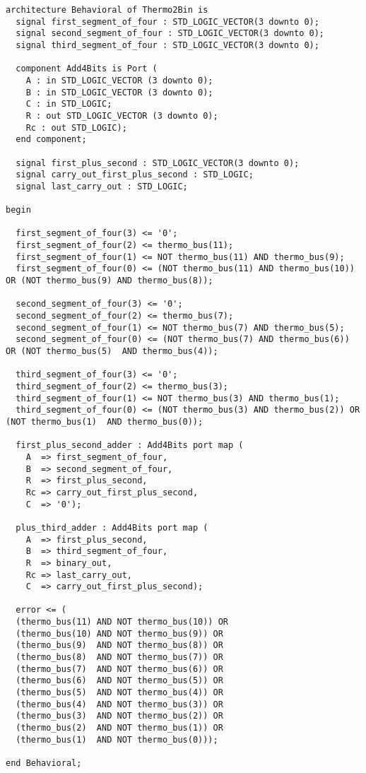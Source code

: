 \begin{verbatim}
architecture Behavioral of Thermo2Bin is
  signal first_segment_of_four : STD_LOGIC_VECTOR(3 downto 0);
  signal second_segment_of_four : STD_LOGIC_VECTOR(3 downto 0);
  signal third_segment_of_four : STD_LOGIC_VECTOR(3 downto 0);

  component Add4Bits is Port (
    A : in STD_LOGIC_VECTOR (3 downto 0);
    B : in STD_LOGIC_VECTOR (3 downto 0);
    C : in STD_LOGIC;
    R : out STD_LOGIC_VECTOR (3 downto 0);
    Rc : out STD_LOGIC);
  end component;

  signal first_plus_second : STD_LOGIC_VECTOR(3 downto 0);
  signal carry_out_first_plus_second : STD_LOGIC;
  signal last_carry_out : STD_LOGIC;

begin

  first_segment_of_four(3) <= '0';
  first_segment_of_four(2) <= thermo_bus(11);
  first_segment_of_four(1) <= NOT thermo_bus(11) AND thermo_bus(9);
  first_segment_of_four(0) <= (NOT thermo_bus(11) AND thermo_bus(10)) OR (NOT thermo_bus(9) AND thermo_bus(8));

  second_segment_of_four(3) <= '0';
  second_segment_of_four(2) <= thermo_bus(7);
  second_segment_of_four(1) <= NOT thermo_bus(7) AND thermo_bus(5);
  second_segment_of_four(0) <= (NOT thermo_bus(7) AND thermo_bus(6)) OR (NOT thermo_bus(5)  AND thermo_bus(4));

  third_segment_of_four(3) <= '0';
  third_segment_of_four(2) <= thermo_bus(3);
  third_segment_of_four(1) <= NOT thermo_bus(3) AND thermo_bus(1);
  third_segment_of_four(0) <= (NOT thermo_bus(3) AND thermo_bus(2)) OR (NOT thermo_bus(1)  AND thermo_bus(0));

  first_plus_second_adder : Add4Bits port map (
    A  => first_segment_of_four,
    B  => second_segment_of_four,
    R  => first_plus_second,
    Rc => carry_out_first_plus_second,
    C  => '0');

  plus_third_adder : Add4Bits port map (
    A  => first_plus_second,
    B  => third_segment_of_four,
    R  => binary_out,
    Rc => last_carry_out,
    C  => carry_out_first_plus_second);

  error <= (
  (thermo_bus(11) AND NOT thermo_bus(10)) OR
  (thermo_bus(10) AND NOT thermo_bus(9)) OR
  (thermo_bus(9)  AND NOT thermo_bus(8)) OR
  (thermo_bus(8)  AND NOT thermo_bus(7)) OR
  (thermo_bus(7)  AND NOT thermo_bus(6)) OR
  (thermo_bus(6)  AND NOT thermo_bus(5)) OR
  (thermo_bus(5)  AND NOT thermo_bus(4)) OR
  (thermo_bus(4)  AND NOT thermo_bus(3)) OR
  (thermo_bus(3)  AND NOT thermo_bus(2)) OR
  (thermo_bus(2)  AND NOT thermo_bus(1)) OR
  (thermo_bus(1)  AND NOT thermo_bus(0)));

end Behavioral;
\end{verbatim}
